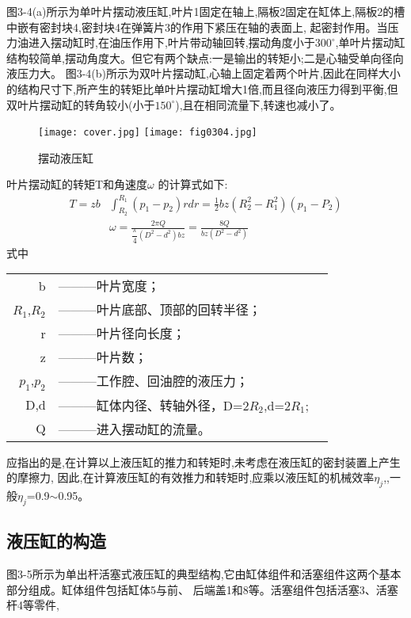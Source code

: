 图3-4(a)所示为单叶片摆动液压缸,叶片1固定在轴上,隔板2固定在缸体上,隔板2的槽中嵌有密封块4,密封块4在弹簧片3的作用下紧压在轴的表面上,
起密封作用。当压力油进入摆动缸时,在油压作用下,叶片带动轴回转,摆动角度小于$300^\circ$,单叶片摆动缸结构较简单,摆动角度大。但它有两个缺点:一是输出的转矩小;二是心轴受单向径向液压力大。
图3-4(b)所示为双叶片摆动缸,心轴上固定着两个叶片,因此在同样大小的结构尺寸下,所产生的转矩比单叶片摆动缸增大1倍,而且径向液压力得到平衡,但双叶片摆动缸的转角较小(小于$150^\circ$),且在相同流量下,转速也减小了。
\begin{figure} [htbp]
    \centering
    \ifOpenSource
    \texttt{[image: cover.jpg]}
    \else
    \texttt{[image: fig0304.jpg]}
    \fi
    \caption{摆动液压缸} %
    \label{fig:fig0304}%
\end{figure}

叶片摆动缸的转矩T和角速度$\omega$ 的计算式如下:
\begin{align}
    T=zb&\int_{R_2}^{R_1}(p_1-p_2)rdr=\frac{1}{2}bz(R_2^2-R^2_1)(p_1-P_2)\\
    &\omega =\frac{2\pi Q}{\dfrac{\pi}{4}(D^2-d^2)bz}=\frac{8Q}{bz(D^2-d^2)}
\end{align}
式中
\begin{tabular}[t]{rll}
    \centering
    b&———叶片宽度；\\
    $R_1$,$R_2$ &———叶片底部、顶部的回转半径；\\
    r&———叶片径向长度；\\
    z&———叶片数；\\
    $p_1$,$p_2$ &———工作腔、回油腔的液压力；\\
    D,d&———缸体内径、转轴外径，D=2$R_2$,d=2$R_1$;\\
    Q&———进入摆动缸的流量。
\end{tabular}

应指出的是,在计算以上液压缸的推力和转矩时,未考虑在液压缸的密封装置上产生的摩擦力,
因此,在计算液压缸的有效推力和转矩时,应乘以液压缸的机械效率$\eta _j$,,一般$\eta _j$=0.9$\sim $0.95。

\begin{center}    
\subsection{液压缸的构造}
\end{center}

图3-5所示为单出杆活塞式液压缸的典型结构,它由缸体组件和活塞组件这两个基本部分组成。缸体组件包括缸体5与前、
后端盖1和8等。活塞组件包括活塞3、活塞杆4等零件,



